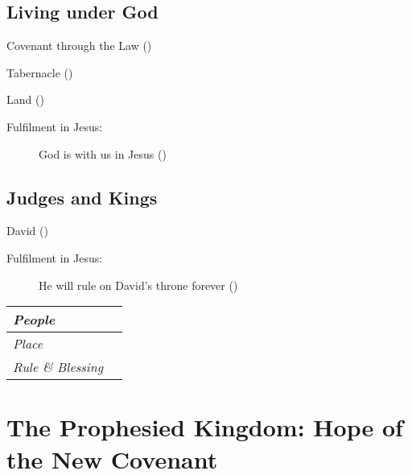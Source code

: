 \documentclass{mycworkshop}
\begin{document}
\vfill

\subsection{Living under God}

\begin{indentblock}
  Covenant through the Law ()

  \vfill

  Tabernacle ()

  \vfill

  Land ()

  \vfill

  \begin{description}
    \item[Fulfilment in Jesus:] God is with us in Jesus ()
  \end{description}
\end{indentblock}

\vfill

\subsection{Judges and Kings}

\begin{indentblock}
  David ()

  \vfill

  \begin{description}
    \item[Fulfilment in Jesus:] He will rule on David's throne forever
      ()
  \end{description}
\end{indentblock}

\vfill

\begin{tabularx}{\linewidth}{|>{\itshape}l|X|}
  \hline
  People & \\[10.8bp]
  \hline
  Place & \\[10.8bp]
  \hline
  Rule \& Blessing & \\[10.8bp]
  \hline
\end{tabularx}
\smallskip

\section{The Prophesied Kingdom: Hope of the New Covenant}
\end{document}
